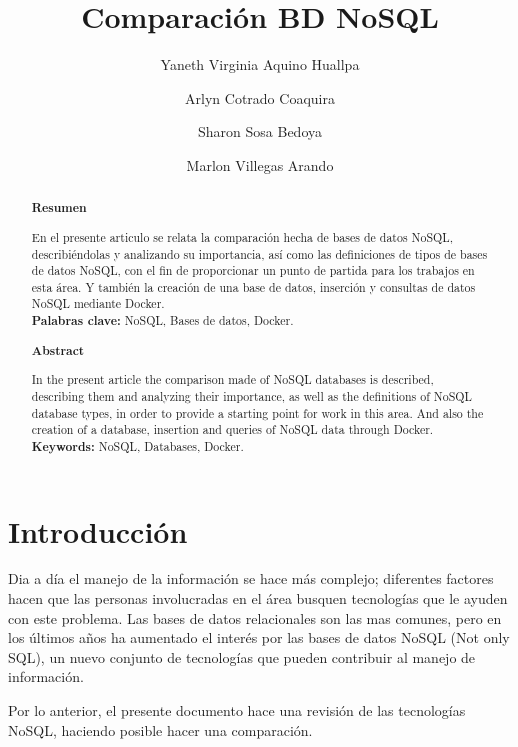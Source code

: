\documentclass[%
 reprint,
 amsmath,amssymb,
 aps,
]{revtex4-1}
\begin{document}
\title{Comparación BD NoSQL}
\author{Yaneth Virginia Aquino Huallpa}
\author{Arlyn Cotrado Coaquira}
\author{Sharon Sosa Bedoya}
\author{Marlon Villegas Arando}
%


\begin{abstract}
\begin{center}
\textbf{Resumen}
\end{center}

En el presente articulo se relata la comparación hecha de bases de datos NoSQL, describiéndolas y analizando su importancia, así como las definiciones de tipos de bases de datos NoSQL, con el fin de proporcionar un punto de partida para los trabajos en esta área. Y también la creación de una base de datos, inserción y consultas de datos NoSQL mediante Docker.\\

\textbf{Palabras clave:}   NoSQL, Bases de datos, Docker.\\

\begin{center}
\textbf{Abstract}
\end{center}
In the present article the comparison made of NoSQL databases is described, describing them and analyzing their importance, as well as the definitions of NoSQL database types, in order to provide a starting point for work in this area. And also the creation of a database, insertion and queries of NoSQL data through Docker.\\
\textbf{Keywords:}  NoSQL, Databases, Docker.\\

\end{abstract}



\maketitle


\section {Introducción}\label{sec:1}

Dia a día el manejo de la información se hace más complejo; diferentes factores hacen que las personas involucradas en el área busquen tecnologías que le ayuden con este problema. Las bases de datos relacionales son las mas comunes, pero en los últimos años ha aumentado el interés por las bases de datos NoSQL (Not only SQL), un nuevo conjunto de tecnologías que pueden contribuir al manejo de información.
\par Por lo anterior, el presente documento hace una revisión de las tecnologías NoSQL, haciendo posible hacer una comparación.\\
\end{document}
